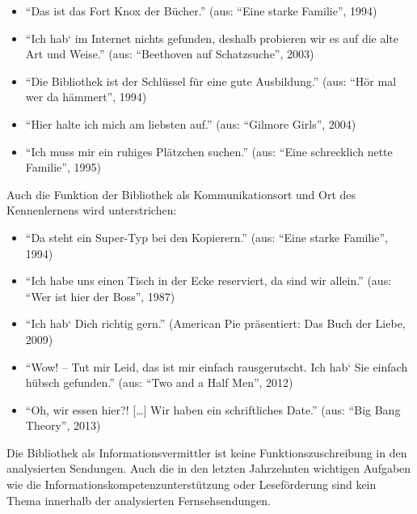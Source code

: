 \begin{flushleft}
\begin{itemize}
\item
  \enquote{Das ist das Fort Knox der Bücher.} (aus: \enquote{Eine starke
  Familie}, 1994)
\item
  \enquote{Ich hab` im Internet nichts gefunden, deshalb probieren wir
  es auf die alte Art und Weise.} (aus: \enquote{Beethoven auf
  Schatzsuche}, 2003)
\item
  \enquote{Die Bibliothek ist der Schlüssel für eine gute Ausbildung.}
  (aus: \enquote{Hör mal wer da hämmert}, 1994)
\item
  \enquote{Hier halte ich mich am liebsten auf.} (aus: \enquote{Gilmore
  Girls}, 2004)
\item
  \enquote{Ich muss mir ein ruhiges Plätzchen suchen.} (aus:
  \enquote{Eine schrecklich nette Familie}, 1995)
\end{itemize}
\end{flushleft}

Auch die Funktion der Bibliothek als Kommunikationsort und Ort des
Kennenlernens wird unterstrichen:

\begin{flushleft}
\begin{itemize}
\item
  \enquote{Da steht ein Super-Typ bei den Kopierern.} (aus:
  \enquote{Eine starke Familie}, 1994)
\item
  \enquote{Ich habe uns einen Tisch in der Ecke reserviert, da sind wir
  allein.} (aus: \enquote{Wer ist hier der Boss}, 1987)
\item
  \enquote{Ich hab` Dich richtig gern.} (American Pie präsentiert: Das
  Buch der Liebe, 2009)
\item
  \enquote{Wow! -- Tut mir Leid, das ist mir einfach rausgerutscht. Ich
  hab` Sie einfach hübsch gefunden.} (aus: \enquote{Two and a Half Men},
  2012)
\item
  \enquote{Oh, wir essen hier?! {[}\ldots{}{]} Wir haben ein
  schriftliches Date.} (aus: \enquote{Big Bang Theory}, 2013)
\end{itemize}
\end{flushleft}

Die Bibliothek als Informationsvermittler ist keine
Funktionszuschreibung in den analysierten Sendungen. Auch die in den
letzten Jahrzehnten wichtigen Aufgaben wie die
Informationskompetenzunterstützung oder Leseförderung sind kein Thema
innerhalb der analysierten Fernsehsendungen.

